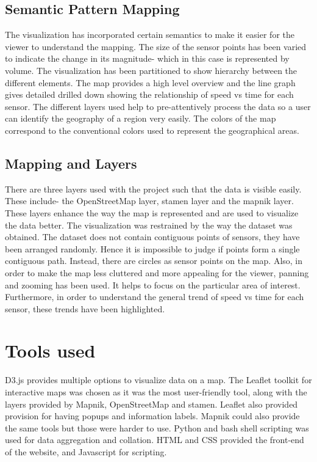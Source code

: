 \documentclass{llncs}
\begin{document}
\subsection {Semantic Pattern Mapping}\label{sec:Semantic Pattern}

The visualization has incorporated certain semantics \cite{Ware2008} to make it easier for the viewer to understand the mapping. The size of the sensor points has been varied to indicate the change in its magnitude- which in this case is represented by volume. The visualization has been partitioned to show hierarchy between the different elements. The map provides a high level overview and the line graph gives detailed drilled down showing the relationship of speed vs time for each sensor. The different layers used help to pre-attentively process the data so a user can identify the geography of a region very easily. The colors of the map correspond to the conventional colors used to represent the geographical areas.

\subsection {Mapping and Layers}\label{sec:Mapping and Layers}
There are three layers used with the project such that the data is visible easily. These include- the OpenStreetMap layer, stamen layer and the mapnik layer. These layers enhance the way the map is represented and are used to visualize the data better. The visualization was restrained by the way the dataset was obtained. The dataset does not contain contiguous points of sensors, they have been arranged randomly. Hence it is impossible to judge if points form a single contiguous path. Instead, there are circles as sensor points on the map. Also, in order to make the map less cluttered and more appealing for the viewer, panning and zooming has been used. It helps to focus on the particular area of interest. Furthermore, in order to understand the general trend of speed vs time for each sensor, these trends have been highlighted.

\section{Tools used}\label{sec:Tools}
D3.js provides multiple options to visualize data on a map. The Leaflet toolkit for interactive maps was chosen as it was the most user-friendly tool, along with the layers provided by Mapnik, OpenStreetMap and stamen. Leaflet also provided provision for having popups and information labels. Mapnik could also provide the same tools but those were harder to use. Python and bash shell scripting was used for data aggregation and collation. HTML and CSS provided the front-end of the website, and Javascript for scripting.
\end{document}
